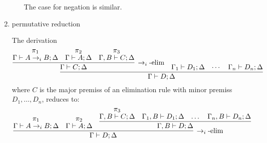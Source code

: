 \begin{enumerate}
\begin{enumerate}
    The case for negation is similar.
  \end{enumerate}

\item permutative reduction

  The derivation
  \[
    \infer{\stp{\Gamma}{D}{\Delta}}
    {\infer[\iimpe]{\stp{\Gamma}{C}{\Delta}}
      {\deduce{\stp{\Gamma}{A\iimp B}{\Delta}}
        {\pi_1}&
        \deduce{\stp{\Gamma}{A}{\Delta}}{\pi_2}&
        \deduce{\stp{\Gamma,B}{C}{\Delta}}{\pi_3}}&
      \stp{\Gamma_1}{D_1}{\Delta}&
      \cdots&
      \stp{\Gamma_n}{D_n}{\Delta}}
  \]
  where $C$ is the major premiss of an elimination rule with minor premiss $D_1, \dots, D_n$, reduces to:
  \[\infer[\iimpe]{\stp{\Gamma}{D}{\Delta}}
    {\deduce{\stp{\Gamma}{A\iimp B}{\Delta}}
      {\pi_1}&
      \deduce{\stp{\Gamma}{A}{\Delta}}
      {\pi_2}&
      \infer{\stp{\Gamma, B}{D}{\Delta}}{
        \deduce{\stp{\Gamma, B}{C}{\Delta}}
        {\pi_3}&
        \stp{\Gamma_1, B}{D_1}{\Delta}&
        \dots&
        \stp{\Gamma_n, B}{D_n}{\Delta}}}
  \]
\end{enumerate}